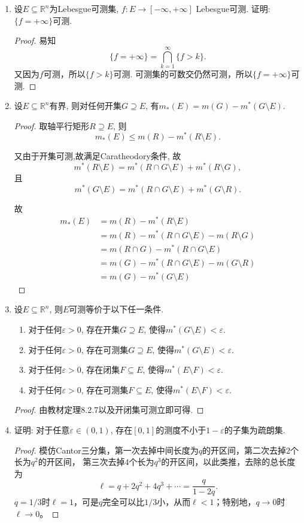 \begin{quiza}
\begin{enumerate}
\item 设\(E\subseteq\mathbb{R}^n\)为Lebesgue可测集, 
\(f:E\rightarrow [-\infty,+\infty]\) Lebesgue可测. 证明: \(\{f=+\infty\}\)可测.
\begin{proof}
	易知$$\{f=+\infty\} = \bigcap_{k=1}^{\infty} \{f>k\}.$$ 又因为\(f\)可测，所以\(\{f>k\}\)可测. 可测集的可数交仍然可测，所以\(\{f=+\infty\}\)可测.
\end{proof}

\item 设\(E\subseteq\mathbb{R}^n\)有界, 
则对任何开集\(G\supseteq E\), 有\(m_*(E)=m(G)-m^*(G\setminus E)\).
\begin{proof}
	取轴平行矩形\(R\supseteq E\), 则$$m_*(E)\leq m(R)-m^*(R\setminus E).$$

又由于开集可测,故满足Caratheodory条件, 故$$m^*(R\setminus E)=m^*(R\cap G\setminus E) + m^*(R\setminus G),$$且$$m^*(G\setminus E)=m^*(R\cap G\setminus E) + m^*(G\setminus R).$$

故\begin{align*}
    m_*(E) &= m(R)-m^*(R\setminus E)\\
    & = m(R)-m^*(R\cap G\setminus E) - m(R\setminus G)\\
    & = m(R\cap G)-m^*(R\cap G\setminus E)\\
    & = m(G)-m^*(R\cap G\setminus E) - m(G\setminus R)\\
    & = m(G)-m^*(G\setminus E)
\end{align*}
\end{proof}
\item 设\(E\subseteq\mathbb{R}^n\), 则\(E\)可测等价于以下任一条件.
\begin{enumerate}[label=(\arabic*)]
\item 对于任何\(\varepsilon>0\), 存在开集\(G\supseteq E\), 使得\(m^*(G\setminus E)<\varepsilon\).
\item 对于任何\(\varepsilon>0\), 存在可测集\(G\supseteq E\), 使得\(m^*(G\setminus E)<\varepsilon\).
\item 对于任何\(\varepsilon>0\), 存在闭集\(F\subseteq E\), 使得\(m^*(E\setminus F)<\varepsilon\).
\item 对于任何\(\varepsilon>0\), 存在可测集\(F\subseteq E\), 使得\(m^*(E\setminus F)<\varepsilon\).
\end{enumerate}
\begin{proof}
	由教材定理8.2.7以及开闭集可测立即可得.
\end{proof}

\item 证明: 对于任意\(\varepsilon\in(0,1)\), 存在\([0,1]\)的测度不小于\(1-\varepsilon\)的子集为疏朗集.
\begin{proof}
	模仿Cantor三分集，第一次去掉中间长度为$q$的开区间，第二次去掉$2$个长为$q^2$的开区间，
    第三次去掉$4$个长为$q^3$的开区间，以此类推，去除的总长度为
    \[\ell=q+2q^2+4q^3+\cdots=\frac{q}{1-2q}.\]
    $q=1/3$时$\ell=1$，可是$q$完全可以比$1/3$小，从而$\ell<1$；特别地，$q\to0$时$\ell\to0$。
\end{proof}


\end{enumerate}
\end{quiza}
